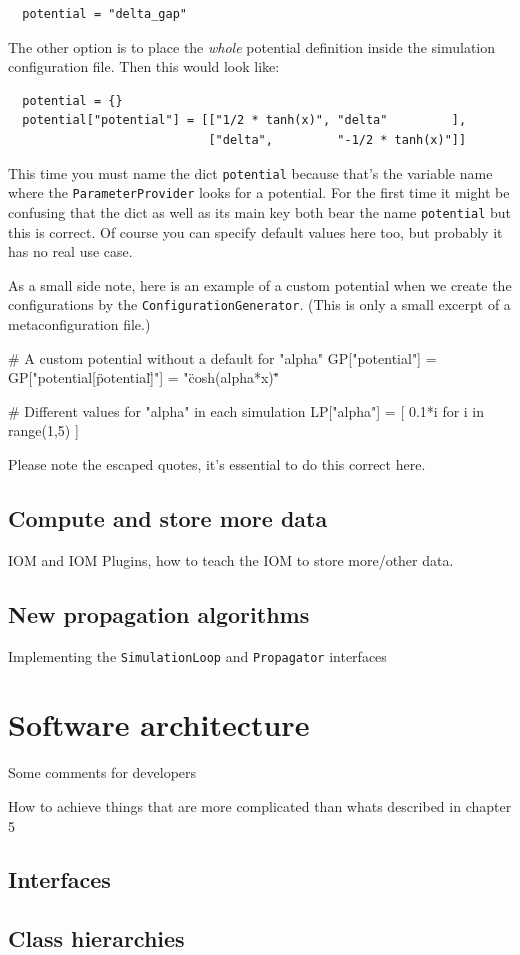 \documentclass[a4paper,10pt]{report}
\begin{document}
\begin{verbatim}
  potential = "delta_gap"
\end{verbatim}

The other option is to place the \emph{whole} potential definition inside the
simulation configuration file. Then this would look like:

\begin{verbatim}
  potential = {}
  potential["potential"] = [["1/2 * tanh(x)", "delta"         ],
                            ["delta",         "-1/2 * tanh(x)"]]
\end{verbatim}

This time you must name the dict \texttt{potential} because that's the
variable name where the \texttt{ParameterProvider} looks for a potential.
For the first time it might be confusing that the dict as well as its main
key both bear the name \texttt{potential} but this is correct. Of course you
can specify default values here too, but probably it has no real use case.

As a small side note, here is an example of a custom potential when we create
the configurations by the \texttt{ConfigurationGenerator}. (This is only a small
excerpt of a metaconfiguration file.)

\begin{python}
  # A custom potential without a default for "alpha"
  GP["potential"] = {}
  GP["potential[\"potential\"]"] = "\"cosh(alpha*x)\""

  # Different values for "alpha" in each simulation
  LP["alpha"] = [ 0.1*i for i in range(1,5) ]
\end{python}

Please note the escaped quotes, it's essential to do this correct here.



\section{Compute and store more data}

IOM and IOM Plugins, how to teach the IOM to store more/other data.

\section{New propagation algorithms}

Implementing the \texttt{SimulationLoop} and \texttt{Propagator} interfaces



\chapter{Software architecture}

Some comments for developers

How to achieve things that are more complicated than whats
described in chapter 5

\section{Interfaces}

\section{Class hierarchies}
\end{document}
